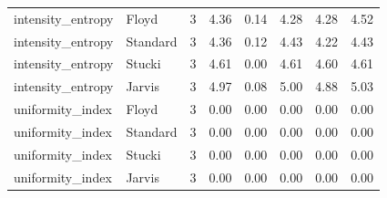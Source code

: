 \begin{tabular}{llrlllll}
intensity_entropy & Floyd & 3 & 4.36 & 0.14 & 4.28 & 4.28 & 4.52 \\
intensity_entropy & Standard & 3 & 4.36 & 0.12 & 4.43 & 4.22 & 4.43 \\
intensity_entropy & Stucki & 3 & 4.61 & 0.00 & 4.61 & 4.60 & 4.61 \\
intensity_entropy & Jarvis & 3 & 4.97 & 0.08 & 5.00 & 4.88 & 5.03 \\
uniformity_index & Floyd & 3 & 0.00 & 0.00 & 0.00 & 0.00 & 0.00 \\
uniformity_index & Standard & 3 & 0.00 & 0.00 & 0.00 & 0.00 & 0.00 \\
uniformity_index & Stucki & 3 & 0.00 & 0.00 & 0.00 & 0.00 & 0.00 \\
uniformity_index & Jarvis & 3 & 0.00 & 0.00 & 0.00 & 0.00 & 0.00 \\
\bottomrule
\end{tabular}
